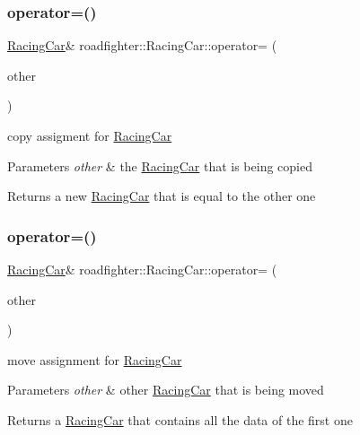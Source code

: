 \subsubsection{\texorpdfstring{operator=()}{operator=()}\hspace{0.1cm}{\footnotesize\ttfamily [1/2]}}
{\footnotesize\ttfamily \hyperlink{classroadfighter_1_1RacingCar}{Racing\+Car}\& roadfighter\+::\+Racing\+Car\+::operator= (\begin{DoxyParamCaption}\item[{const \hyperlink{classroadfighter_1_1RacingCar}{Racing\+Car} \&}]{other }\end{DoxyParamCaption})\hspace{0.3cm}{\ttfamily [default]}}

copy assigment for \hyperlink{classroadfighter_1_1RacingCar}{Racing\+Car} 
\begin{DoxyParams}{Parameters}
{\em other} & the \hyperlink{classroadfighter_1_1RacingCar}{Racing\+Car} that is being copied \\
\hline
\end{DoxyParams}
\begin{DoxyReturn}{Returns}
a new \hyperlink{classroadfighter_1_1RacingCar}{Racing\+Car} that is equal to the other one 
\end{DoxyReturn}
\mbox{\label{classroadfighter_1_1RacingCar_a370fa9acf725d13ecb5b96ccce61b9d3}} 
\subsubsection{\texorpdfstring{operator=()}{operator=()}\hspace{0.1cm}{\footnotesize\ttfamily [2/2]}}
{\footnotesize\ttfamily \hyperlink{classroadfighter_1_1RacingCar}{Racing\+Car}\& roadfighter\+::\+Racing\+Car\+::operator= (\begin{DoxyParamCaption}\item[{\hyperlink{classroadfighter_1_1RacingCar}{Racing\+Car} \&\&}]{other }\end{DoxyParamCaption})\hspace{0.3cm}{\ttfamily [default]}}

move assignment for \hyperlink{classroadfighter_1_1RacingCar}{Racing\+Car} 
\begin{DoxyParams}{Parameters}
{\em other} & other \hyperlink{classroadfighter_1_1RacingCar}{Racing\+Car} that is being moved \\
\hline
\end{DoxyParams}
\begin{DoxyReturn}{Returns}
a \hyperlink{classroadfighter_1_1RacingCar}{Racing\+Car} that contains all the data of the first one 
\end{DoxyReturn}
\mbox{\label{classroadfighter_1_1RacingCar_a20c4363a1d31cc17d7d82c8f9a219d2d}} 
